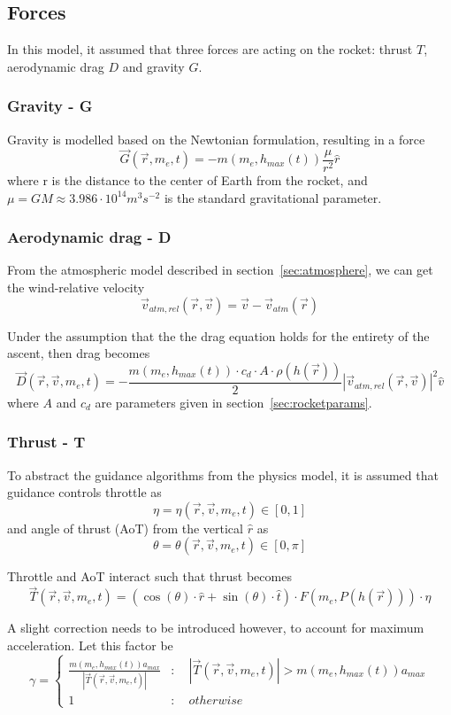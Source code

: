 \documentclass[11pt]{article}
\begin{document}
\subsection{Forces}
In this model, it assumed that three forces are acting on the rocket: thrust $T$, aerodynamic drag $D$ and gravity $G$.

\subsubsection{Gravity - G}
Gravity is modelled based on the Newtonian formulation, resulting in a force
$$
\vec{G}(\vec{r}, m_e, t) = -m(m_e, h_{max}(t)) \frac{\mu}{r^2} \hat{r} 
$$
where r is the distance to the center of Earth from the rocket, and $\mu = GM \approx 3.986\cdot10^{14} m^3 s^{−2}$ is the standard gravitational parameter.

\subsubsection{Aerodynamic drag - D} \label{sec:drag}

From the atmospheric model described in section~\ref{sec:atmosphere}, we can get the wind-relative velocity
$$
\vec{v}_{atm,rel} (\vec{r}, \vec{v}) = \vec{v} - \vec{v}_{atm} (\vec{r})
$$

Under the assumption that the the drag equation holds for the entirety of the ascent, then drag becomes
$$
\vec{D}(\vec{r}, \vec{v}, m_e, t) = - \frac{ m(m_e, h_{max}(t)) \cdot  c_d  \cdot A \cdot \rho(h(\vec{r})) }{2} {\left| \vec{v}_{atm,rel} (\vec{r}, \vec{v}) \right|}^2 \hat{v}
$$
where $A$ and $c_d$ are parameters given in section~\ref{sec:rocketparams}.
\subsubsection{Thrust - T}

To abstract the guidance algorithms from the physics model, it is assumed that guidance controls throttle as
$$
\eta = \eta(\vec{r}, \vec{v}, m_e, t)\in[0,1]
$$
and angle of thrust (AoT) from the vertical $\hat{r}$ as
$$
\theta = \theta(\vec{r}, \vec{v}, m_e, t)\in\left[0,\pi\right]
$$

Throttle and AoT interact such that thrust becomes
$$
\vec{T}(\vec{r}, \vec{v}, m_e, t) = \left( \cos ( \theta ) \cdot\hat{r} + \sin ( \theta ) \cdot\hat{t} \right) \cdot F(m_e, P(h(\vec{r}))) \cdot \eta
$$

A slight correction needs to be introduced however, to account for maximum acceleration.
Let this factor be
$$
\gamma = \begin{cases}
  \frac{m(m_e, h_{max}(t)) a_{max}}{\left| \vec{T}(\vec{r}, \vec{v}, m_e, t) \right|} 
  & : \quad \left| \vec{T}(\vec{r}, \vec{v}, m_e, t) \right| > m(m_e, h_{max}(t)) a_{max}
  \\
  1 
  & : \quad otherwise
\end{cases}
$$
\end{document}
